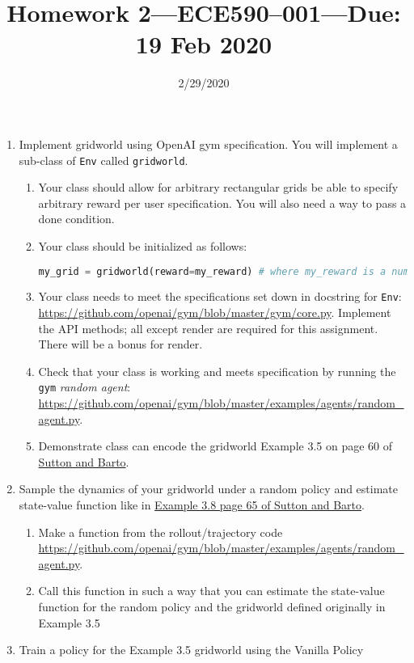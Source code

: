 \documentclass{article}
\title{Homework 2---ECE590--001---{\bf Due: 19 Feb 2020}}
\date{2/29/2020}
\begin{document}
\maketitle
\begin{enumerate}
\item Implement gridworld using OpenAI gym specification. You will implement a
sub-class of {\tt Env} called {\tt gridworld}.
  \begin{enumerate}
  \item Your class should allow for arbitrary rectangular grids be able to
    specify arbitrary reward per user specification. You will also need a way to
    pass a done condition.
  \item Your class should be initialized as follows:
    \begin{lstlisting}[language=python]
      my_grid = gridworld(reward=my_reward) # where my_reward is a numpy.array of shape (n,m)
    \end{lstlisting}
  \item Your class needs to meet the specifications set down in docstring for
    {\tt Env}: \url{https://github.com/openai/gym/blob/master/gym/core.py}.
    Implement the API methods; all except render are required for this assignment.
    There will be a bonus for render.
  \item Check that your class is working and meets specification by running the
    {\tt gym} {\em random agent}:
    \url{https://github.com/openai/gym/blob/master/examples/agents/random_agent.py}.
  \item Demonstrate class can encode the gridworld Example 3.5 on page 60 of
    \href{http://incompleteideas.net/book/RLbook2018.pdf}{Sutton and Barto}.
  \end{enumerate}
\item
  Sample the dynamics of your gridworld under a random policy and estimate
  state-value function like in
  \href{http://www.incompleteideas.net/book/RLbook2018.pdf}{Example 3.8 page 65 of Sutton and Barto}.
  \begin{enumerate}
  \item Make a function from the rollout/trajectory code
    \url{https://github.com/openai/gym/blob/master/examples/agents/random_agent.py}.
  \item Call this function in such a way that you can estimate the state-value
    function for the random policy and the gridworld defined originally in Example
    3.5
  \end{enumerate}
\item Train a policy for the Example 3.5 gridworld using the Vanilla Policy

\end{enumerate}
\end{document}
